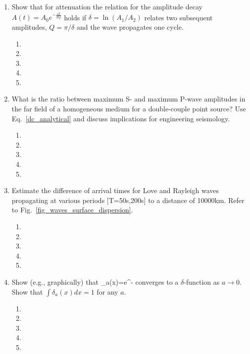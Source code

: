 \begin{enumerate}
\begin{enumerate}
\item[] 
\end{enumerate}
\item
Show that for attenuation the relation for the amplitude decay  
$
A(t) = A_0 e^{-\frac{\omega t}{2 Q}} $
holds if  
$\delta = \ln(A_1/A_2)$ 
relates two subsequent amplitudes, 
$ Q = \pi / \delta $
  and the wave propagates one cycle.
  \begin{enumerate}
\item[]
\item[]
\item[] 
\item[]
\item[] 
\end{enumerate}
\item
What is the ratio between maximum S- and maximum P-wave amplitudes in the far field of a homogeneous medium for a double-couple point source? Use Eq.~\ref{dc_analytical} and discuss implications for engineering seismology. 
\begin{enumerate}
\item[]
\item[]
\item[] 
\item[]
\item[] 
\end{enumerate}
\item Estimate the difference of arrival times for Love and Rayleigh waves propagating at various periods [T=50s,200s] to a distance of 10000km. Refer to Fig.~\ref{fig_waves_surface_dispersion}.
\begin{enumerate}
\item[]
\item[]
\item[] 
\item[]
\item[] 
\end{enumerate}
\item
Show (e.g., graphically) that
\be
\delta_a(x)=e^{-}
\ee
converges to a $\delta$-function as $a\rightarrow 0$. Show that $\int\delta_a(x)dx=1$ for any $a$.  
\begin{enumerate}
\item[]
\item[]
\item[] 
\item[]
\item[] 
\end{enumerate}
\end{enumerate}
